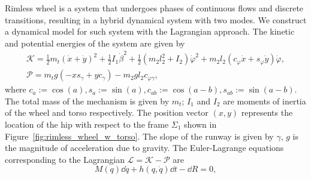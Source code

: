 Rimless wheel is a system that undergoes phases of continuous flows and discrete
transitions, resulting in a hybrid dynamical system with two modes. We construct
a dynamical model for such system with the Lagrangian approach. The kinetic and
potential energies of the system are given by
\begin{equation*}
  \begin{gathered}
    \mathcal{K} = \frac{1}{2} m_t(\dot{x} + \dot{y})^2  +  \frac{1}{2} I_1 \dot{\beta}^2  + 
                    \frac{1}{2} (m_2 l_2^2 + I_2) \dot{\varphi}^2 + m_2 l_2(c_{\varphi} \dot{x} + s_{\varphi} \dot{y}) \dot{\varphi}, \\
    \mathcal{P} = m_tg(-x s_{\gamma} + y c_\gamma) - m_2 g l_2 c_{\varphi \gamma},
  \end{gathered}
\end{equation*}
\noindent where $c_a := \cos{(a)}, s_a := \sin{(a)}, c_{ab} := \cos{(a - b)},
s_{ab} := \sin{(a - b)}$. The total mass of the mechanism is given by $m_t$;
$I_1$ and $I_2$ are moments of inertia of the wheel and torso respectively. The
position vector $(x, y)$ represents the location of the hip with respect to the
frame $\Sigma_1$ shown in Figure~\ref{fig:rimless_wheel_w_torso}. The slope of
the runway is given by $\gamma$, $g$ is the magnitude of acceleration due to
gravity.
%
The Euler-Lagrange equations corresponding to the Lagrangian $\mathcal{L} =
\mathcal{K} - \mathcal{P}$ are
\begin{equation}
  M(q) \dd \dot{q} + h(q, \dot{q})\dd t - \dd R  = 0,
  \label{eq:dynamics}
\end{equation}


